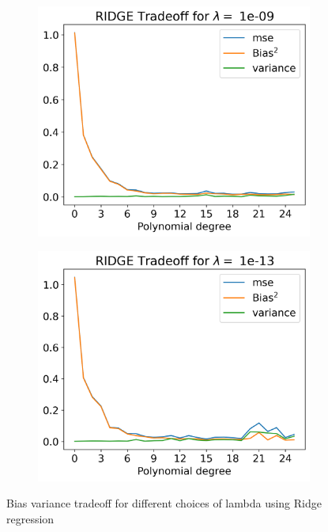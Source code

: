 \documentclass[12pt]{article}
\begin{document}
\begin{figure}[H]
  \begin{subfigure}{.5\textwidth}
    \centering
    \includegraphics[width=\textwidth]{../figures/tradeoff_RIDGE_1e-09real.png}
    \caption{}
    \label{fig:}
  \end{subfigure}
  \begin{subfigure}{.5\textwidth}
    \centering
    \includegraphics[width=\textwidth]{../figures/tradeoff_RIDGE_1e-13real.png}
    \caption{}
    \label{fig:}
  \end{subfigure}
  \caption{Bias variance tradeoff for different choices of lambda using Ridge regression}
  \label{fig:ridge_tradeoff_real}
\end{figure}
\end{document}
